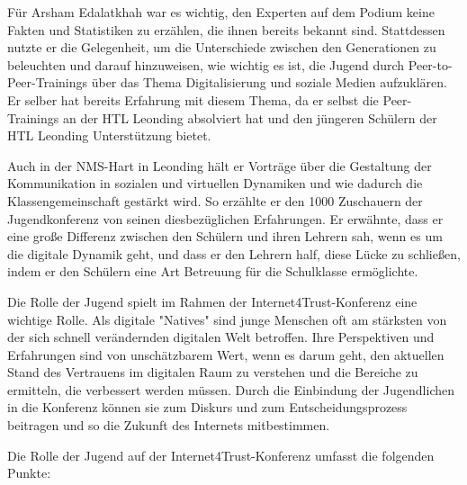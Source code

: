 Für Arsham Edalatkhah war es wichtig, den Experten auf dem Podium keine Fakten und Statistiken zu erzählen, die ihnen bereits bekannt sind. Stattdessen nutzte er die Gelegenheit, um die Unterschiede zwischen den Generationen zu beleuchten und darauf hinzuweisen, wie wichtig es ist, die Jugend durch Peer-to-Peer-Trainings über das Thema Digitalisierung und soziale Medien aufzuklären. Er selber hat bereits Erfahrung mit diesem Thema, da er selbst die Peer-Trainings an der HTL Leonding absolviert hat und den jüngeren Schülern der HTL Leonding Unterstützung bietet.

Auch in der NMS-Hart in Leonding hält er Vorträge über die Gestaltung der Kommunikation in sozialen und virtuellen Dynamiken und wie dadurch die Klassengemeinschaft gestärkt wird. So erzählte er den 1000 Zuschauern der Jugendkonferenz von seinen diesbezüglichen Erfahrungen. Er erwähnte, dass er eine große Differenz zwischen den Schülern und ihren Lehrern sah, wenn es um die digitale Dynamik geht, und dass er den Lehrern half, diese Lücke zu schließen, indem er den Schülern eine Art Betreuung für die Schulklasse ermöglichte.

Die Rolle der Jugend spielt im Rahmen der Internet4Trust-Konferenz eine wichtige Rolle. Als digitale "Natives" sind junge Menschen oft am stärksten von der sich schnell verändernden digitalen Welt betroffen. Ihre Perspektiven und Erfahrungen sind von unschätzbarem Wert, wenn es darum geht, den aktuellen Stand des Vertrauens im digitalen Raum zu verstehen und die Bereiche zu ermitteln, die verbessert werden müssen. Durch die Einbindung der Jugendlichen in die Konferenz können sie zum Diskurs und zum Entscheidungsprozess beitragen und so die Zukunft des Internets mitbestimmen.


Die Rolle der Jugend auf der Internet4Trust-Konferenz umfasst die folgenden Punkte:

